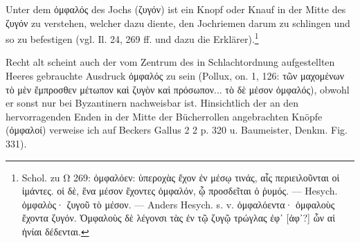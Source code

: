 \documentclass[a4paper, 11pt, oneside]{article}
\begin{document}
Unter dem ὀμφαλός des Jochs (ζυγόν) ist ein Knopf oder Knauf in der Mitte des ζυγόν zu verstehen, welcher dazu diente, den Jochriemen darum zu schlingen und so zu befestigen (vgl. Il. 24, 269 ff. und dazu die Erklärer).\footnote{Schol. zu Ω 269: ὀμφαλόεν: ὑπεροχὰς ἔχον ἐν μέσῳ τινάς, αἷς περιειλοῦνται οἱ ἱμάντες. οἱ δὲ, ἕνα μέσον ἔχοντες ὀμφαλόν, ᾧ προσδεῖται ὁ ῥυμός. --- Hesych. ὀμφαλὸς· ζυγοῦ τὸ μέσον. --- Anders Hesych. s. v. ὀμφαλόεντα· ὀμφαλοὺς ἔχοντα ζυγόν. Ὀμφαλοὺς δὲ λέγονσι τὰς ἐν τῷ ζυγῷ τρώγλας ἐφ᾽ [ἀφ᾽?] ὧν αἱ ἡνίαι δέδενται.}

Recht alt scheint auch der vom Zentrum des in Schlachtordnung aufgestellten Heeres gebrauchte Ausdruck ὀμφαλός zu sein (Pollux, on. 1, 126: τῶν μαχομένων τὸ μὲν ἔμπροσθεν μέτωπον καὶ ζυγὸν καὶ πρόσωπον... τὸ δὲ μέσον ὀμφαλός), obwohl er sonst nur bei Byzantinern nachweisbar ist. Hinsichtlich der an den hervorragenden Enden in der Mitte der Bücherrollen angebrachten Knöpfe (ὀμφαλοί) verweise ich auf Beckers Gallus 2 2 p. 320 u. Baumeister, Denkm. Fig. 331).
\end{document}
